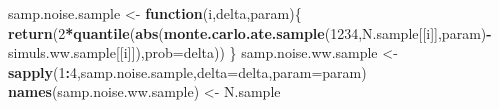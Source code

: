 \documentclass[]{book}
\newenvironment{Shaded}{\begin{snugshade}}{\end{snugshade}}
\newcommand{\ControlFlowTok}[1]{\textcolor[rgb]{0.13,0.29,0.53}{\textbf{#1}}}
\newcommand{\DataTypeTok}[1]{\textcolor[rgb]{0.13,0.29,0.53}{#1}}
\newcommand{\DecValTok}[1]{\textcolor[rgb]{0.00,0.00,0.81}{#1}}
\newcommand{\KeywordTok}[1]{\textcolor[rgb]{0.13,0.29,0.53}{\textbf{#1}}}
\newcommand{\NormalTok}[1]{#1}
\newcommand{\OperatorTok}[1]{\textcolor[rgb]{0.81,0.36,0.00}{\textbf{#1}}}
\newcommand{\StringTok}[1]{\textcolor[rgb]{0.31,0.60,0.02}{#1}}
\theoremstyle{definition}
\theoremstyle{definition}
\theoremstyle{definition}
\theoremstyle{remark}
\begin{document}
\begin{Shaded}
\begin{Highlighting}[]
\NormalTok{samp.noise.sample <-}\StringTok{ }\ControlFlowTok{function}\NormalTok{(i,delta,param)\{}
  \KeywordTok{return}\NormalTok{(}\DecValTok{2}\OperatorTok{*}\KeywordTok{quantile}\NormalTok{(}\KeywordTok{abs}\NormalTok{(}\KeywordTok{monte.carlo.ate.sample}\NormalTok{(}\DecValTok{1234}\NormalTok{,N.sample[[i]],param)}\OperatorTok{-}\NormalTok{simuls.ww.sample[[i]]),}\DataTypeTok{prob=}\NormalTok{delta))}
\NormalTok{\}}
\NormalTok{samp.noise.ww.sample <-}\StringTok{ }\KeywordTok{sapply}\NormalTok{(}\DecValTok{1}\OperatorTok{:}\DecValTok{4}\NormalTok{,samp.noise.sample,}\DataTypeTok{delta=}\NormalTok{delta,}\DataTypeTok{param=}\NormalTok{param)}
\KeywordTok{names}\NormalTok{(samp.noise.ww.sample) <-}\StringTok{ }\NormalTok{N.sample}


\end{Highlighting}
\end{Shaded}
\end{document}
